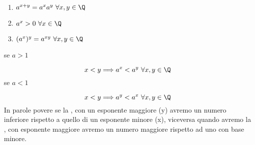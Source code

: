 \documentclass[../analisi.tex]{subfiles}
\begin{document}
\begin{enumerate}
	\item $ a^{x+y} = a^x a^y\ \forall x,y \in \Q$
	\item $ a^x > 0\ \forall x \in \Q$
	\item $ (a^x)^y = a^{xy}\ \forall x,y \in \Q$ 
\end{enumerate}
se $a > 1$

\begin{equation*}
x < y \Longrightarrow a^x < a^y\ \forall x,y \in \Q
\end{equation*}
se $a < 1$

\begin{equation*}
	x < y \Longrightarrow a^y < a^x\ \forall x,y \in \Q
\end{equation*}
In parole povere se la , con un esponente maggiore (y) avremo un numero inferiore rispetto a quello di un esponente minore (x), viceversa quando avremo la , con esponente maggiore avremo un numero maggiore rispetto ad uno con base minore.
\end{document}

